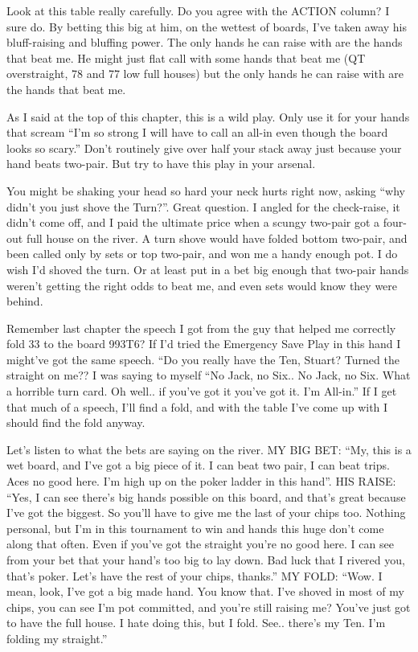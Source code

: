 Look at this table really carefully. Do you agree with the ACTION
column? I sure do. By betting this big at him, on the wettest of
boards, I've taken away his bluff-raising and bluffing power. The only
hands he can raise with are the hands that beat me. He might just
flat call with some hands that beat me (QT overstraight, 78 and 77 low
full houses) but the only hands he can raise with are the hands that
beat me.

As I said at the top of this chapter, this is a wild play. Only use it
for your hands that scream ``I'm so strong I will have to call an
all-in even though the board looks so scary.'' Don't routinely give
over half your stack away just because your hand beats two-pair. But
try to have this play in your arsenal.

You might be shaking your head so hard your neck hurts right now,
asking ``why didn't you just shove the Turn?''. Great question. I
angled for the check-raise, it didn't come off, and I paid the
ultimate price when a scungy two-pair got a four-out full house on the
river. A turn shove would have folded bottom two-pair, and been called
only by sets or top two-pair, and won me a handy enough pot. I do wish
I'd shoved the turn. Or at least put in a bet big enough that two-pair
hands weren't getting the right odds to beat me, and even sets would
know they were behind.

Remember last chapter the speech I got from the guy that helped me
correctly fold 33 to the board 993T6? If I'd tried the Emergency Save
Play in this hand I might've got the same speech. ``Do you really have
the Ten, Stuart? Turned the straight on me?? I was saying to myself
``No Jack, no Six.. No Jack, no Six. What a horrible turn card. Oh
well.. if you've got it you've got it. I'm All-in.'' If I get that
much of a speech, I'll find a fold, and with the table I've come up
with I should find the fold anyway.

Let's listen to what the bets are saying on the river.
MY BIG BET: ``My, this is a wet board, and I've got a big piece of
it. I can beat two pair, I can beat trips. Aces no good here. I'm high
up on the poker ladder in this hand''.
HIS RAISE: ``Yes, I can see there's big hands possible on this board,
and that's great because I've got the biggest. So you'll have to give
me the last of your chips too. Nothing personal, but I'm in this
tournament to win and hands this huge don't come along that
often. Even if you've got the straight you're no good here. I can see
from your bet that your hand's too big to lay down. Bad luck that I
rivered you, that's poker. Let's have the rest of your chips,
thanks.''
MY FOLD: ``Wow. I mean, look, I've got a big made hand. You know
that. I've shoved in most of my chips, you can see I'm pot committed,
and you're still raising me? You've just got to have the full house. I
hate doing this, but I fold. See.. there's my Ten. I'm folding my
straight.''

